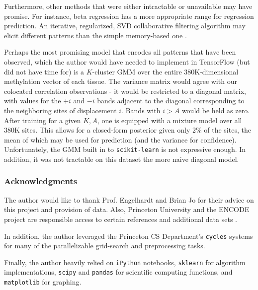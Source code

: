 \documentclass{article} %
\begin{document}
Furthermore, other methods that were either intractable or unavailable may have promise. For instance, beta regression has a more appropriate range for regression prediction. An iterative, regularized, SVD collaborative filtering algorithm may elicit different patterns than the simple memory-based one \cite{percy}.

Perhaps the most promising model that encodes all patterns that have been observed, which the author would have needed to implement in TensorFlow (but did not have time for) is a $K$-cluster GMM over the entire 380K-dimensional methylation vector of each tissue. The variance matrix would agree with our colocated correlation observations - it would be restricted to a diagonal matrix, with values for the $+i$ and $-i$ bands adjacent to the diagonal corresponding to the neighboring sites of displacement $i$. Bands with $i> A$ would be held as zero. After training for a given $K,A$, one is equipped with a mixture model over all 380K sites. This allows for a closed-form posterior given only 2\% of the sites, the mean of which may be used for prediction (and the variance for confidence). Unfortunately, the GMM built in to \texttt{scikit-learn} is not expressive enough. In addition, it was not tractable on this dataset the more naive diagonal model.


\subsubsection*{Acknowledgments}

The author would like to thank Prof. Engelhardt and Brian Jo for their advice on this project and provision of data. Also, Princeton University and the ENCODE project are responsible access to certain references and additional data sets \cite{encode2004encode}.

In addition, the author leveraged the Princeton CS Department's \texttt{cycles} systems for many of the parallelizable grid-search and preprocessing tasks.

Finally, the author heavily relied on \texttt{iPython} \cite{iPython} notebooks, \texttt{sklearn} \cite{scikit-learn} for algorithm implementations, \texttt{scipy} \cite{scipy} and \texttt{pandas} \cite{pandas} for scientific computing functions, and \texttt{matplotlib} \cite{matplotlib} for graphing.




\end{document}
